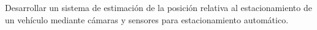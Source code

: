 \noindent
Desarrollar un sistema de estimación de la posición relativa al estacionamiento de un vehículo mediante cámaras y sensores para estacionamiento automático.
